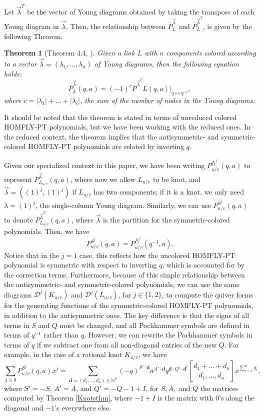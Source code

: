 \documentclass[11pt]{amsart}
\theoremstyle{plain}
\newtheorem{theoremN}{Theorem}[section]
\theoremstyle{definition}
\theoremstyle{remark}
\begin{document}
Let $\vec{\lambda}^T$ be the vector of Young diagrams obtained by taking the transpose of each Young diagram in $\vec{\lambda}$. Then, the relationship between $\overline{P}^{\vec{\lambda}}_L$ and $\overline{P}^{\vec{\lambda}^T}_L$, is given by the following Theorem.

\begin{theoremN}[Theorem 4.4, \cite{TVW19}]
    Given a link $L$ with $n$ components colored according to a vector $\vec{\lambda}=(\lambda_1,...,\lambda_n)$ of Young diagrams, then the following equation holds:
    \begin{equation}
        \overline{P}^{\vec{\lambda}}_L(q,a)=(-1)^c \overline{P}^{\vec{\lambda}^T}L(q,a)\bigg|_{q\mapsto q^{-1}},
    \end{equation}
    where $c=|\lambda_1|+...+|\lambda_i|$, the sum of the number of nodes in the Young diagrams.
\end{theoremN}

It should be noted that the theorem is stated in terms of unreduced colored HOMFLY-PT polynomials, but we have been working with the reduced ones. In the reduced context, the theorem implies that the antisymmetric- and symmetric-colored HOMFLY-PT polynomials are related by inverting $q$.

Given our specialized context in this paper, we have been writing $P_{u/v}^{\bigwedge^j}(q,a)$ to represent $P_{L_{u/v}}^{\vec{\lambda}}(q,a)$, where now we allow $L_{u/v}$ to be knot, and $\vec{\lambda}=((1)^j,(1)^j)$ if $L_{u/v}$ has two components; if it is a knot, we only need $\lambda=(1)^j$, the single-column Young diagram. Similarly, we can use $P_{u/v}^{S^j}(q,a)$ to denote $P_{L_{u/v}}^{\vec{\lambda}^T}(q,a)$, where $\vec{\lambda}$ is the partition for the symmetric-colored polynomials. Then, we have 
\[
P_{u/v}^{S^j}(q,a)=P_{u/v}^{\bigwedge^j}(q^{-1},a).
\]
Notice that in the $j=1$ case, this reflects how the uncolored HOMFLY-PT polynomial is symmetric with respect to inverting $q$, which is accounted for by the correction terms. Furthermore, because of this simple relationship between the antisymmetric- and symmetric-colored polynomials, we can use the same diagrams $\mathcal{D}^j(K_{u/v})$ and $\mathcal{D}^j(L_{u/v})$, for $j\in\{1,2\}$, to compute the quiver forms for the generating functions of the symmetric-colored HOMFLY-PT polynomials, in addition to the antisymmetric ones. The key difference is that the signs of all terms in $S$ and $Q$ must be changed, and all Pochhammer symbols are defined in terms of $q^{-1}$ rather than $q$. However, we can rewrite the Pochhammer symbols in terms of $q$ if we subtract one from all non-diagonal entries of the new $Q$. For example, in the case of a rational knot $K_{u/v}$, we have
\[
\sum_{j\geq 0} P_{u/v}^{S^j}(q,a)x^j=\sum_{\textbf{d}=(d_1,...,d_u)\in \mathbb{N}^u}(-q)^{S'\cdot \textbf{d}}a^{A'\cdot \textbf{d}}q^{\textbf{d} \cdot Q'\cdot \textbf{d}^t} {d_1+...+d_u\brack d_1,...,d_u}x^{\sum_{i=1}^u d_i},
\]
where $S'=-S$, $A'=A$, and $Q'=-Q-1+I$, for $S,A,$ and $Q$ the matrices computed by Theorem \ref{Knotsthm}, where $-1+I$ is the matrix with $0$'s along the diagonal and $-1$'s everywhere else.
\end{document}
